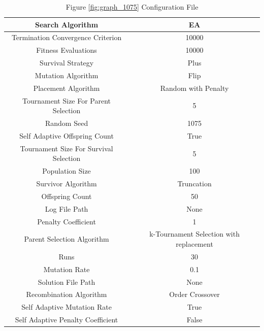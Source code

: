 \documentclass{standalone}
\begin{document}
\begin{table}[!htb]
	\centering
	\caption{Figure \ref{fig:graph_1075} Configuration File}
	\label{tab:graph_1075}
	\begin{tabular}{| c | c |}
		\hline
		Search Algorithm		& EA		 \\
		\hline
		Termination Convergence Criterion		& 10000		 \\
		\hline
		Fitness Evaluations		& 10000		 \\
		\hline
		Survival Strategy		& Plus		 \\
		\hline
		Mutation Algorithm		& Flip		 \\
		\hline
		Placement Algorithm		& Random with Penalty		 \\
		\hline
		Tournament Size For Parent Selection		& 5		 \\
		\hline
		Random Seed		& 1075		 \\
		\hline
		Self Adaptive Offspring Count		& True		 \\
		\hline
		Tournament Size For Survival Selection		& 5		 \\
		\hline
		Population Size		& 100		 \\
		\hline
		Survivor Algorithm		& Truncation		 \\
		\hline
		Offspring Count		& 50		 \\
		\hline
		Log File Path		& None		 \\
		\hline
		Penalty Coefficient		& 1		 \\
		\hline
		Parent Selection Algorithm		& k-Tournament Selection with replacement		 \\
		\hline
		Runs		& 30		 \\
		\hline
		Mutation Rate		& 0.1		 \\
		\hline
		Solution File Path		& None		 \\
		\hline
		Recombination Algorithm		& Order Crossover		 \\
		\hline
		Self Adaptive Mutation Rate		& True		 \\
		\hline
		Self Adaptive Penalty Coefficient		& False		 \\
		\hline
	\end{tabular}
\end{table}
\end{document}
